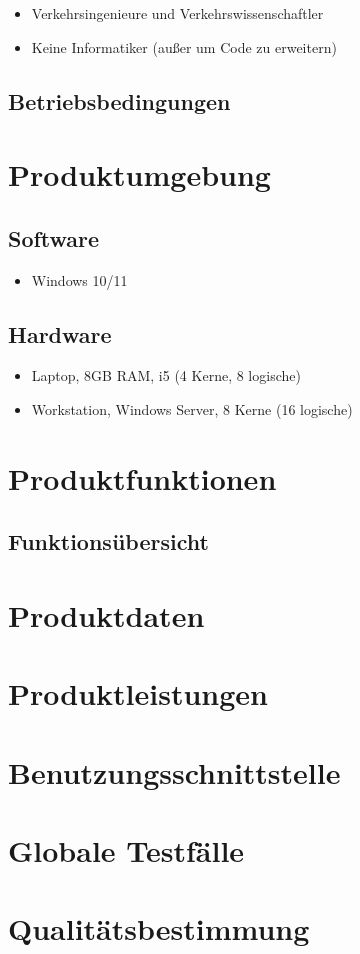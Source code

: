 \documentclass{article}
\begin{document}
\begin{itemize}
    \item Verkehrsingenieure und Verkehrswissenschaftler
    \item Keine Informatiker (außer um Code zu erweitern)
\end{itemize}
  
\subsection{Betriebsbedingungen}

\section{Produktumgebung}
\subsection{Software}
\begin{itemize}
    \item Windows 10/11
\end{itemize}
\subsection{Hardware}
\begin{itemize}
    \item Laptop, 8GB RAM, i5 (4 Kerne, 8 logische)
    \item Workstation, Windows Server, 8 Kerne (16 logische)
\end{itemize}

\section{Produktfunktionen}
\subsection{Funktionsübersicht}

\section{Produktdaten}

\section{Produktleistungen}

\section{Benutzungsschnittstelle}

\section{Globale Testfälle}

\section{Qualitätsbestimmung}
\end{document}
